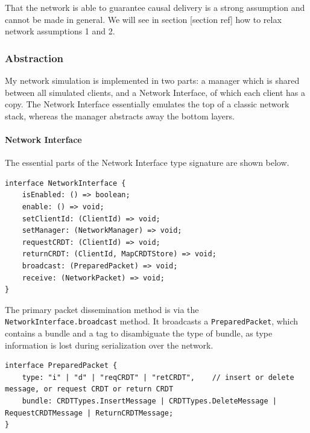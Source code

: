 \documentclass[12pt,a4paper,twoside,openright]{report}
\begin{document}
		That the network is able to guarantee causal delivery is a strong assumption and cannot be made in general. We will see in section [section ref] how to relax network assumptions 1 and 2.
		
		\subsubsection{Abstraction}
		My network simulation is implemented in two parts: a manager which is shared between all simulated clients, and a Network Interface, of which each client has a copy. The Network Interface essentially emulates the top of a classic network stack, whereas the manager abstracts away the bottom layers. 

		\paragraph{Network Interface} The essential parts of the Network Interface type signature are shown below.
		
\begin{lstlisting}[caption=NetworkInterface Type Signature (cleaned)]
interface NetworkInterface {
	isEnabled: () => boolean;
	enable: () => void;
	setClientId: (ClientId) => void;
	setManager: (NetworkManager) => void;
	requestCRDT: (ClientId) => void;
	returnCRDT: (ClientId, MapCRDTStore) => void;
	broadcast: (PreparedPacket) => void;
	receive: (NetworkPacket) => void;
}
\end{lstlisting}

		The primary packet dissemination method is via the \lstinline|NetworkInterface.broadcast| method. It broadcasts a \lstinline|PreparedPacket|, which contains a bundle and a tag to disambiguate the type of bundle, as type information is lost during serialization over the network.

\begin{lstlisting}	
interface PreparedPacket {
	type: "i" | "d" | "reqCRDT" | "retCRDT",    // insert or delete message, or request CRDT or return CRDT
	bundle: CRDTTypes.InsertMessage | CRDTTypes.DeleteMessage | RequestCRDTMessage | ReturnCRDTMessage;
}
\end{lstlisting}
		
\end{document}
